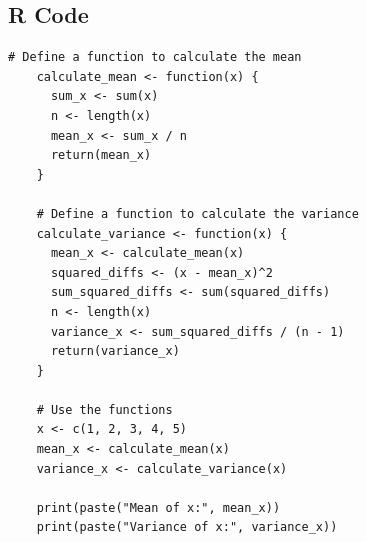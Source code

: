 \documentclass[a4paper,12pt]{article}
\begin{document}
\subsection{R Code}

\lipsum[1]

\begin{lstlisting}[style=R]
    # Define a function to calculate the mean
    calculate_mean <- function(x) {
      sum_x <- sum(x)
      n <- length(x)
      mean_x <- sum_x / n
      return(mean_x)
    }
    
    # Define a function to calculate the variance
    calculate_variance <- function(x) {
      mean_x <- calculate_mean(x)
      squared_diffs <- (x - mean_x)^2
      sum_squared_diffs <- sum(squared_diffs)
      n <- length(x)
      variance_x <- sum_squared_diffs / (n - 1)
      return(variance_x)
    }
    
    # Use the functions
    x <- c(1, 2, 3, 4, 5)
    mean_x <- calculate_mean(x)
    variance_x <- calculate_variance(x)
    
    print(paste("Mean of x:", mean_x))
    print(paste("Variance of x:", variance_x))
\end{lstlisting}


\newpage




\end{document}
